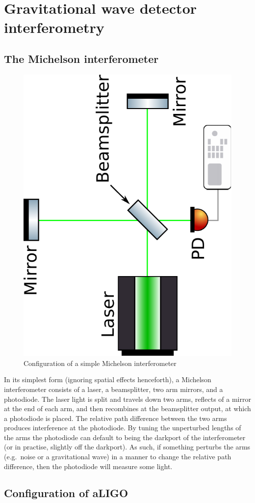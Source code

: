 \documentclass[aps,pra,superscriptaddress,reprint,nofootinbib]{revtex4-1}
\begin{document}
\section{Gravitational wave detector interferometry}
\label{sec:gwIFO}

\subsection{The Michelson interferometer}

\begin{figure}
	\begin{center}
	\includegraphics[height=0.5\textwidth,angle=-90]{figures/Michelson_interferometer.pdf}
	\end{center}
	\caption{Configuration of a simple Michelson interferometer}
	\label{fig:Michelson}
\end{figure}

In its simplest form (ignoring spatial effects henceforth), a Michelson interferometer consists of a laser, a beamsplitter, two arm mirrors, and a photodiode. The laser light is split and travels down two arms, reflects of a mirror at the end of each arm, and then recombines at the beamsplitter output, at which a photodiode is placed. The relative path difference between the two arms produces interference at the photodiode. By tuning the unperturbed lengths of the arms the photodiode can default to being the darkport of the interferometer (or in practise, slightly off the darkport). As such, if something perturbs the arms (e.g.\ noise or a gravitational wave) in a manner to change the relative path difference, then the photodiode will measure some light.


\subsection{Configuration of aLIGO}
\end{document}
